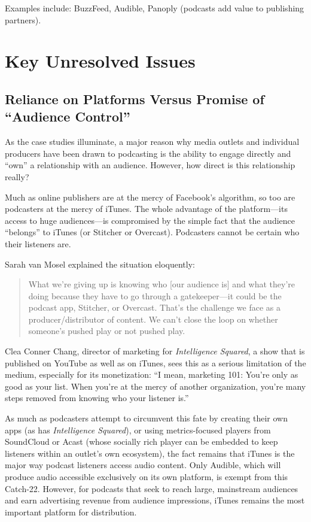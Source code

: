 \documentclass[notoc, symmetric, nobib, nols]{towcenter-guideto-book}
\begin{document}
Examples include: BuzzFeed, Audible, Panoply (podcasts add value to publishing partners).

\chapter{Key Unresolved Issues}

\section{Reliance on Platforms Versus Promise of ``Audience Control''} 

As the case studies illuminate, a major reason why media outlets and individual producers have been drawn to podcasting is the ability to engage directly and ``own'' a relationship with an audience. However, how direct is this relationship really? 

Much as online publishers are at the mercy of Facebook's algorithm, so too are podcasters at the mercy of iTunes. The whole advantage of the platform---its access to huge audiences---is compromised by the simple fact that the audience ``belongs'' to iTunes (or Stitcher or Overcast). Podcasters cannot be certain who their listeners are.

Sarah van Mosel explained the situation eloquently: 

\begin{quote}
What we're giving up is knowing who [our audience is] and what they're doing because they have to go through a gatekeeper---it could be the podcast app, Stitcher, or Overcast. That's the challenge we face as a producer/distributor of content. We can't close the loop on whether someone's pushed play or not pushed play.\autocite{mosel}
\end{quote}

Clea Conner Chang, director of marketing for \textit{Intelligence Squared}, a show that is published on YouTube as well as on iTunes, sees this as a serious limitation of the medium, especially for its monetization: ``I mean, marketing 101: You're only as good as your list. When you're at the mercy of another organization, you're many steps removed from knowing who your listener is.''\autocite{chang}

As much as podcasters attempt to circumvent this fate by creating their own apps (as has \textit{Intelligence Squared}), or using metrics-focused players from SoundCloud or Acast (whose socially rich player can be embedded to keep listeners within an outlet's own ecosystem), the fact remains that iTunes is the major way podcast listeners access audio content.\autocite{digiday} Only Audible, which will produce audio accessible exclusively on its own platform, is exempt from this Catch-22. However, for podcasts that seek to reach large, mainstream audiences and earn advertising revenue from audience impressions, iTunes remains the most important platform for distribution. 
 
\end{document}
